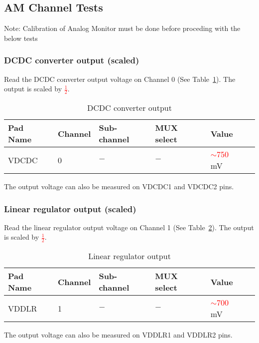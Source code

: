 \documentclass[11pt]{article}   			%
\newcommand\todo[1]{\textcolor{red}{#1}}
\begin{document}
\subsection{AM Channel Tests}
Note: Calibration of Analog Monitor \cite{AMACv2Calib} must be done before proceding with the below tests

\subsubsection{DCDC converter output (scaled)}
Read the DCDC converter output voltage on Channel 0 (See Table~\ref{tab:dcdco}). The output is scaled by \todo{$\frac{1}{2}$}.
\begin{table}[h]
  \begin{center}
\begin{tabular}{|l|l|l|l|l|l|}
\hline
{\bf Pad Name} & {\bf Channel} & {\bf Sub-channel} & {\bf MUX select} & {\bf Value} \\
\hline
VDCDC & 0 & $-$ & $-$ & \todo{$\sim$750} mV\\
\hline
\end{tabular}
\caption{DCDC converter output}
\label{tab:dcdco}
\end{center}
\end{table}
The output voltage can also be measured on VDCDC1 and VDCDC2 pins.

\subsubsection{Linear regulator output (scaled)}
Read the linear regulator output voltage on Channel 1 (See Table~\ref{tab:lino}). The output is scaled by \todo{$\frac{1}{2}$}.
\begin{table}[h]
  \begin{center}
\begin{tabular}{|l|l|l|l|l|l|}
\hline
{\bf Pad Name} & {\bf Channel} & {\bf Sub-channel} & {\bf MUX select} & {\bf Value} \\
\hline
VDDLR & 1 & $-$ & $-$ & \todo{$\sim$700} mV\\
\hline
\end{tabular}
\caption{Linear regulator output}
\label{tab:lino}
\end{center}
\end{table}
The output voltage can also be measured on VDDLR1 and VDDLR2 pins.
\end{document}
